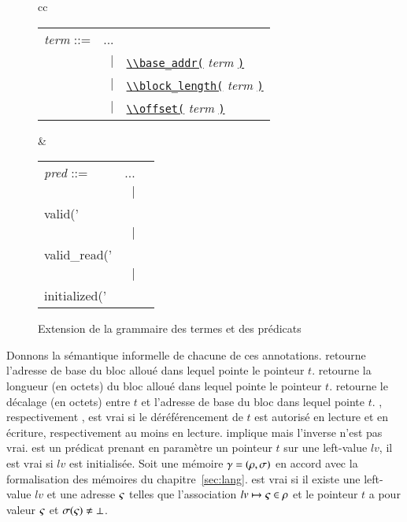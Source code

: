 \begin{figure}
  \centering
  \begin{tabular}{cc}
    \begin{tabular}{lrl}
      \textit{term} ::= & ... \\
      & $\mid$
      & \underline{\lstinline'\\base_addr('} \textit{term} \underline{\lstinline')'} \\
      & $\mid$
      & \underline{\lstinline'\\block_length('} \textit{term} \underline{\lstinline')'} \\
      & $\mid$
      & \underline{\lstinline'\\offset('} \textit{term} \underline{\lstinline')'} \\
    \end{tabular}
    &
    \begin{tabular}{lrl}
      \textit{pred} ::= & ... \\
      & $\mid$
      & \underline{\lstinline'\\valid('} \textit{term} \underline{\lstinline')'} \\
      & $\mid$
      & \underline{\lstinline'\\valid_read('} \textit{term} \underline{\lstinline')'} \\
      & $\mid$
      & \underline{\lstinline'\\initialized('} \textit{term} \underline{\lstinline')'} \\
    \end{tabular}
  \end{tabular}
  \caption{Extension de la grammaire des termes et des prédicats
    \label{fig:gram-ext}}
\end{figure}


Donnons la sémantique informelle de chacune de ces annotations.
\baseaddrt retourne l'adresse de base du bloc alloué dans lequel pointe le
pointeur $t$.
\blocklengtht retourne la longueur (en octets) du bloc alloué dans lequel
pointe le pointeur $t$.
\offsett retourne le décalage (en octets) entre $t$ et l'adresse de
base du bloc dans lequel pointe $t$.
\validt, respectivement \validreadt, est vrai si le déréférencement de
$t$ est autorisé en lecture et en écriture, respectivement au moins en
lecture.
\validt implique \validreadt mais l'inverse n'est pas vrai.
\initializedt est un prédicat prenant en paramètre un pointeur $t$ sur une
left-value $lv$, il est vrai si $lv$ est initialisée.
Soit une mémoire $\gamma = (\rho, \sigma)$ en accord avec la formalisation des
mémoires du chapitre~\ref{sec:lang}.
\initializedt est vrai si il existe une left-value $lv$ et une adresse $\varsigma$
telles que l'association $lv \mapsto \varsigma \in \rho$ et le pointeur $t$ a pour
valeur $\varsigma$ et $\sigma(\varsigma) \neq \bot$.


